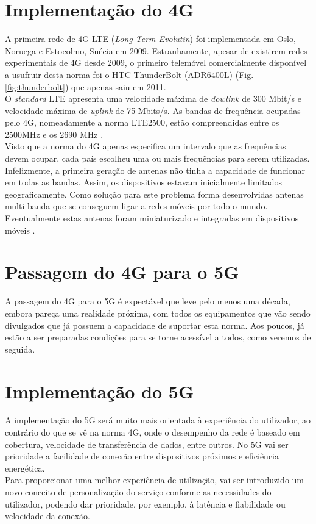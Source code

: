 \documentclass{llncs}
\begin{document}
\section{Implementação do 4G}
A primeira rede de 4G LTE (\textit{Long Term Evolutin}) foi implementada
em Oslo, Noruega e Estocolmo, Suécia em 2009. 
Estranhamente, apesar de existirem redes experimentais de 4G desde
2009, o primeiro telemóvel comercialmente disponível a usufruir desta
norma foi o HTC ThunderBolt (ADR6400L) (Fig. \ref{fig:thunderbolt}) que 
apenas saiu em 2011.\\
O \textit{standard} LTE apresenta uma velocidade máxima 
de \textit{dowlink} de 300 Mbit/s e velocidade máxima de
\textit{uplink} de 75 Mbits/s.
As bandas de frequência ocupadas pelo 4G, nomeadamente a norma 
LTE2500,  estão compreendidas entre os 2500MHz e os 2690 MHz 
\cite{XinLi18}.\\
Visto que a norma do 4G apenas especifica um intervalo que as frequências
devem ocupar, cada país escolheu uma ou mais frequências para serem
utilizadas.
Infelizmente, a primeira geração de antenas não tinha a capacidade de
funcionar em todas as bandas. Assim, os dispositivos estavam inicialmente
limitados geograficamente. Como solução para este problema forma
desenvolvidas antenas multi-banda que se conseguem ligar a redes móveis
por todo o mundo. Eventualmente estas antenas foram miniaturizado e
integradas em dispositivos móveis \cite{XinLi18}.

\section{Passagem do 4G para o 5G}
A passagem do 4G para o 5G é expectável que leve pelo menos uma
década, embora pareça uma realidade próxima, com todos os 
equipamentos que vão sendo divulgados que já possuem a capacidade
de suportar esta norma. Aos poucos, já estão a ser preparadas
condições para se torne acessível a todos, como veremos de 
seguida.

\section{Implementação do 5G}
A implementação do 5G será muito mais orientada à experiência do
utilizador, ao contrário do que se vê na norma 4G, onde o 
desempenho da rede é baseado em cobertura, velocidade de 
transferência de dados, entre outros. No 5G vai ser prioridade a
facilidade de conexão entre dispositivos próximos e eficiência
energética.\\
Para proporcionar uma melhor experiência de utilização, vai ser
introduzido um novo conceito de personalização do serviço
conforme as necessidades do utilizador, podendo dar prioridade,
por exemplo, à latência e fiabilidade ou velocidade da conexão.\\
\end{document}
